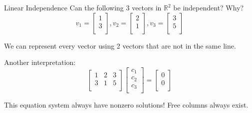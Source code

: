 \documentclass{beamer}
\begin{document}
\begin{frame}{Linear Independence}
Can the following 3 vectors in $\mathbb{R}^2$ be independent? Why?
\begin{equation*}
    v_1=\left[ \begin{array}{c}
        1\\
        3\\
    \end{array} \right] , v_2=\left[ \begin{array}{c}
        2\\
        1\\
    \end{array} \right] , v_3=\left[ \begin{array}{c}
        3\\
        5\\
    \end{array} \right]
\end{equation*}

We can represent every vector using 2 vectors that are not in the same line.

\vspace{3pt}
Another interpretation:
\begin{equation*}
    \left[ \begin{matrix}
        1&		2&		3\\
        3&		1&		5\\
    \end{matrix} \right] \left[ \begin{array}{c}
        c_1\\
        c_2\\
        c_3\\
    \end{array} \right] =\left[ \begin{array}{c}
        0\\
        0\\
    \end{array} \right]
\end{equation*}

This equation system always have nonzero solutions! Free columns always exist.
\end{frame}
\end{document}
